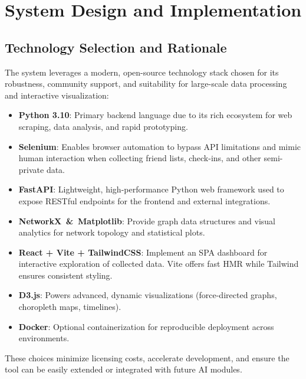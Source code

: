 \documentclass[13pt,a4paper]{report}
\begin{document}
\chapter{System Design and Implementation}

\section{Technology Selection and Rationale}
The system leverages a modern, open-source technology stack chosen for its robustness, community support, and suitability for large-scale data processing and interactive visualization:
\begin{itemize}
    \item \textbf{Python 3.10}: Primary backend language due to its rich ecosystem for web scraping, data analysis, and rapid prototyping.
    \item \textbf{Selenium}: Enables browser automation to bypass API limitations and mimic human interaction when collecting friend lists, check-ins, and other semi-private data.
    \item \textbf{FastAPI}: Lightweight, high-performance Python web framework used to expose RESTful endpoints for the frontend and external integrations.
    \item \textbf{NetworkX \,\&\, Matplotlib}: Provide graph data structures and visual analytics for network topology and statistical plots.
    \item \textbf{React + Vite + TailwindCSS}: Implement an SPA dashboard for interactive exploration of collected data. Vite offers fast HMR while Tailwind ensures consistent styling.
    \item \textbf{D3.js}: Powers advanced, dynamic visualizations (force-directed graphs, choropleth maps, timelines).
    \item \textbf{Docker}: Optional containerization for reproducible deployment across environments.
\end{itemize}
These choices minimize licensing costs, accelerate development, and ensure the tool can be easily extended or integrated with future AI modules.
\end{document}
